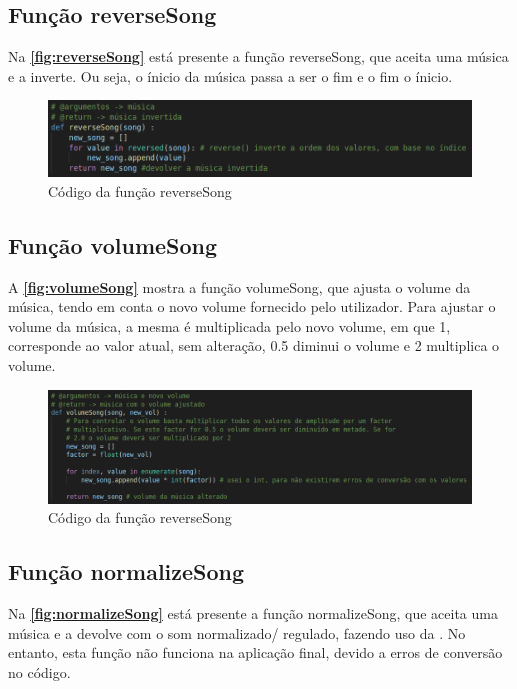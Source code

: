 \documentclass{report}
\begin{document}
\subsection{Função reverseSong}
\label{ssec:reverseSong}
Na \textbf{\autoref{fig:reverseSong}} está presente a função reverseSong, que aceita uma música e a inverte. Ou seja, 
o ínicio da música passa a ser o fim e o fim o ínicio.

\begin{figure}[!h]
\center 
\includegraphics[width=330pt]{img/reverseSong.png}
\caption{Código da função reverseSong}
\label{fig:reverseSong}
\end{figure}

\subsection{Função volumeSong}
\label{ssec:volumeSong}
A \textbf{\autoref{fig:volumeSong}} mostra a função volumeSong, que ajusta o volume da música, tendo em conta o novo volume 
fornecido pelo utilizador. Para ajustar o volume da música, a mesma é multiplicada pelo novo volume, em que 1, corresponde ao 
valor atual, sem alteração, 0.5 diminui o volume e 2 multiplica o volume.

\begin{figure}[!h]
\center 
\includegraphics[width=330pt]{img/volumeSong.png}
\caption{Código da função reverseSong}
\label{fig:volumeSong}
\end{figure}

\subsection{Função normalizeSong}
\label{ssec:normalizeSong}
Na \textbf{\autoref{fig:normalizeSong}} está presente a função normalizeSong, que aceita uma música e a devolve com o som 
normalizado/ regulado, fazendo uso da . No entanto, esta função não funciona na aplicação final, 
devido a erros de conversão no código.
\end{document}
